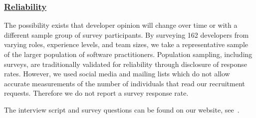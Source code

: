 \subsubsection{\underline{Reliability}}
The possibility exists that developer opinion will change over time or with a different sample group of survey participants.
By surveying 162 developers from varying roles, experience levels, and team sizes, we take a representative sample of the larger population of software practitioners.
Population sampling, including surveys, are traditionally validated for reliability through disclosure of response rates.
However, we used social media and mailing lists which do not allow accurate measurements of the number of individuals that read our recruitment requests.
Therefore we do not report a survey response rate.

The interview script and survey questions can be found on our website, see~\cite{companion_site}. 

